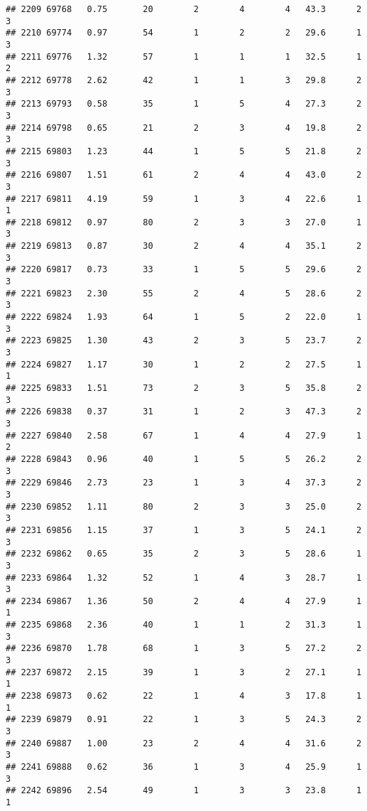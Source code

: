 \documentclass[
]{article}
\begin{document}
\begin{verbatim}
## 2209 69768   0.75       20        2        4        4   43.3      2      3
## 2210 69774   0.97       54        1        2        2   29.6      1      3
## 2211 69776   1.32       57        1        1        1   32.5      1      2
## 2212 69778   2.62       42        1        1        3   29.8      2      3
## 2213 69793   0.58       35        1        5        4   27.3      2      3
## 2214 69798   0.65       21        2        3        4   19.8      2      3
## 2215 69803   1.23       44        1        5        5   21.8      2      3
## 2216 69807   1.51       61        2        4        4   43.0      2      3
## 2217 69811   4.19       59        1        3        4   22.6      1      1
## 2218 69812   0.97       80        2        3        3   27.0      1      3
## 2219 69813   0.87       30        2        4        4   35.1      2      3
## 2220 69817   0.73       33        1        5        5   29.6      2      3
## 2221 69823   2.30       55        2        4        5   28.6      2      3
## 2222 69824   1.93       64        1        5        2   22.0      1      3
## 2223 69825   1.30       43        2        3        5   23.7      2      3
## 2224 69827   1.17       30        1        2        2   27.5      1      1
## 2225 69833   1.51       73        2        3        5   35.8      2      3
## 2226 69838   0.37       31        1        2        3   47.3      2      3
## 2227 69840   2.58       67        1        4        4   27.9      1      2
## 2228 69843   0.96       40        1        5        5   26.2      2      3
## 2229 69846   2.73       23        1        3        4   37.3      2      3
## 2230 69852   1.11       80        2        3        3   25.0      2      3
## 2231 69856   1.15       37        1        3        5   24.1      2      3
## 2232 69862   0.65       35        2        3        5   28.6      1      3
## 2233 69864   1.32       52        1        4        3   28.7      1      3
## 2234 69867   1.36       50        2        4        4   27.9      1      1
## 2235 69868   2.36       40        1        1        2   31.3      1      3
## 2236 69870   1.78       68        1        3        5   27.2      2      3
## 2237 69872   2.15       39        1        3        2   27.1      1      1
## 2238 69873   0.62       22        1        4        3   17.8      1      1
## 2239 69879   0.91       22        1        3        5   24.3      2      3
## 2240 69887   1.00       23        2        4        4   31.6      2      3
## 2241 69888   0.62       36        1        3        4   25.9      1      3
## 2242 69896   2.54       49        1        3        3   23.8      1      1

\end{verbatim}
\end{document}
